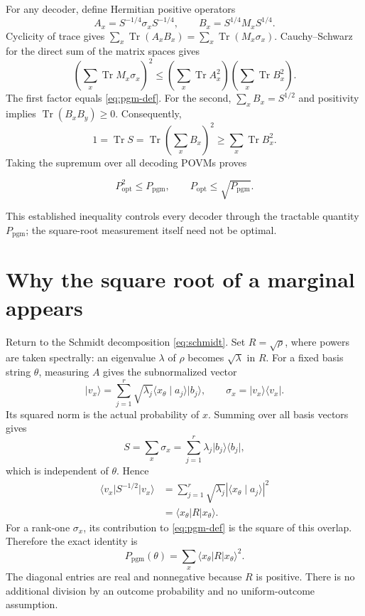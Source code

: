 \documentclass[11pt,a4paper]{article}
\newcommand{\Tr}{\operatorname{Tr}}
\newcommand{\ket}[1]{\lvert #1\rangle}
\newcommand{\bra}[1]{\langle #1\rvert}
\newcommand{\ip}[2]{\langle #1\mid #2\rangle}
\newcommand{\pgm}{P_{\mathrm{pgm}}}
\newcommand{\popt}{P_{\mathrm{opt}}}
\newcommand{\newsection}[1]{\section{#1}}
\begin{document}
For any decoder, define Hermitian positive operators
\[
A_x=S^{-1/4}\sigma_xS^{-1/4},\qquad
B_x=S^{1/4}M_xS^{1/4}.
\]
Cyclicity of trace gives $\sum_x\Tr(A_xB_x)=\sum_x\Tr(M_x\sigma_x)$. Cauchy--Schwarz for the direct sum of the matrix spaces gives
\[
\left(\sum_x\Tr M_x\sigma_x\right)^2
\leq\left(\sum_x\Tr A_x^2\right)
     \left(\sum_x\Tr B_x^2\right).
\]
The first factor equals \eqref{eq:pgm-def}. For the second, $\sum_xB_x=S^{1/2}$ and positivity implies $\Tr(B_xB_y)\geq0$. Consequently,
\[
1=\Tr S=\Tr\left(\sum_x B_x\right)^2
\geq\sum_x\Tr B_x^2.
\]
Taking the supremum over all decoding POVMs proves
\begin{keybox}
\begin{equation}\label{eq:discrimination}
\popt^2\leq\pgm,\qquad\popt\leq\sqrt{\pgm}.
\end{equation}
\end{keybox}
This established inequality controls every decoder through the tractable quantity $\pgm$; the square-root measurement itself need not be optimal.

\newsection{Why the square root of a marginal appears}
Return to the Schmidt decomposition \eqref{eq:schmidt}. Set $R=\sqrt\rho$, where powers are taken spectrally: an eigenvalue $\lambda$ of $\rho$ becomes $\sqrt\lambda$ in $R$. For a fixed basis string $\theta$, measuring $A$ gives the subnormalized vector
\[
\ket{v_x}=\sum_{j=1}^r\sqrt{\lambda_j}\ip{x_\theta}{a_j}\ket{b_j},
\qquad\sigma_x=\ket{v_x}\bra{v_x}.
\]
Its squared norm is the actual probability of $x$. Summing over all basis vectors gives
\[
S=\sum_x\sigma_x=\sum_{j=1}^r\lambda_j\ket{b_j}\bra{b_j},
\]
which is independent of $\theta$. Hence
\begin{align*}
\bra{v_x}S^{-1/2}\ket{v_x}
&=\sum_{j=1}^r\sqrt{\lambda_j}|\ip{x_\theta}{a_j}|^2\\
&=\bra{x_\theta}R\ket{x_\theta}.
\end{align*}
For a rank-one $\sigma_x$, its contribution to \eqref{eq:pgm-def} is the square of this overlap. Therefore the exact identity is
\begin{equation}\label{eq:pgm-id}
\pgm(\theta)=\sum_x\bra{x_\theta}R\ket{x_\theta}^{\!2}.
\end{equation}
The diagonal entries are real and nonnegative because $R$ is positive. There is no additional division by an outcome probability and no uniform-outcome assumption.
\end{document}
